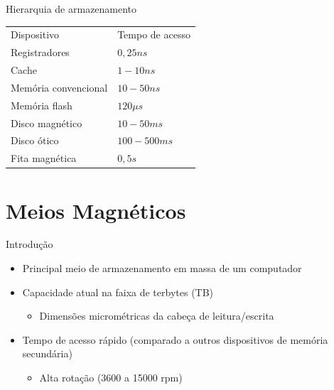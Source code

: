 \documentclass[aspectratio=169,
				xcolor=table]{beamer}
\begin{document}
		\begin{frame}{Hierarquia de armazenamento}
			\begin{eftable}				\centering
				\begin{tabular}{ll}
				{\color[HTML]{FFFFFF} Dispositivo} & {\color[HTML]{FFFFFF} Tempo de acesso} \\
				Registradores                      & $0,25 ns$                                \\
				Cache                              & $1-10 ns$                                \\
				Memória convencional               & $10-50 ns$                               \\
				Memória flash                      & $120 \mu s$                                 \\
				Disco magnético                    & $10-50 ms$                               \\
				Disco ótico                        & $100-500 ms$                             \\
				Fita magnética                     & $0,5 s$                    
				\end{tabular}
			\end{eftable}			
		\end{frame}	
		
		
	\section{Meios Magnéticos}
	
	\begin{frame}{Introdução}
		\begin{itemize}
			\item Principal meio de armazenamento em massa de um computador
			\vspace{1em}
			\item Capacidade atual na faixa de terbytes (TB)
			\begin{itemize}
				\item Dimensões micrométricas da cabeça de leitura/escrita
			\end{itemize}
			\vspace{1em}
			\item Tempo de acesso rápido (comparado a outros dispositivos de memória secundária)
			\begin{itemize}
				\item Alta rotação (3600 a 15000 rpm)			
			\end{itemize}
		\end{itemize}
	\end{frame}
	
\end{document}
